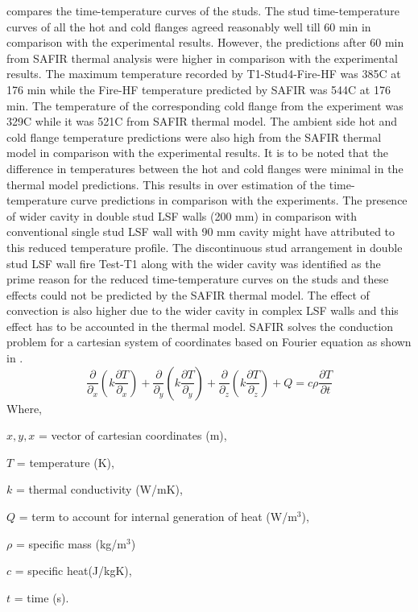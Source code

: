  compares the time-temperature curves of the studs. The stud time-temperature curves of all the hot and cold flanges agreed reasonably well till 60 min in comparison with the experimental results. However, the predictions after 60 min from SAFIR thermal analysis were higher in comparison with the experimental results. The maximum temperature recorded by T1-Stud4-Fire-HF was 385\degree C at 176 min while the Fire-HF temperature predicted by SAFIR was 544\degree C at 176 min. The temperature of the corresponding cold flange from the experiment was 329\degree C while it was 521\degree C from SAFIR thermal model. The ambient side hot and cold flange temperature predictions were also high from the SAFIR thermal model in comparison with the experimental results. It is to be noted that the difference in temperatures between the hot and cold flanges were minimal in the thermal model predictions. This results in over estimation of the time-temperature curve predictions in comparison with the experiments. The presence of wider cavity in double stud LSF walls (200 mm) in comparison with conventional single stud LSF wall with 90 mm cavity might have attributed to this reduced temperature profile. The discontinuous stud arrangement in double stud LSF wall fire Test-T1 along with the wider cavity was identified as the prime reason for the reduced time-temperature curves on the studs and these effects could not be predicted by the SAFIR thermal model. The effect of convection is also higher due to the wider cavity in complex LSF walls and this effect has to be accounted in the thermal model. SAFIR solves the conduction problem for a cartesian system of coordinates based on Fourier equation as shown in .
\begin{equation}\label{eq:safir-conduction}
	\dfrac{\partial}{\partial_x}\left(k\dfrac{\partial T}{\partial_x}\right)+\dfrac{\partial}{\partial_y}\left(k\dfrac{\partial T}{\partial_y}\right)+\dfrac{\partial}{\partial_z}\left(k\dfrac{\partial T}{\partial_z}\right)+Q=c\rho\dfrac{\partial T}{\partial t}
\end{equation}
Where,
\begin{description}[itemsep=0pt,parsep=0pt]
	\item $x,y,x$ = vector of cartesian coordinates (m),
	\item $T$ = temperature (K),
	\item $k$ = thermal conductivity (W/mK),
	\item $Q$ = term to account for internal generation of heat (W/m$^3$),
	\item $\rho$ = specific mass (kg/m$^3$)
	\item $c$ = specific heat(J/kgK),
	\item $t$ = time (s).
\end{description}


